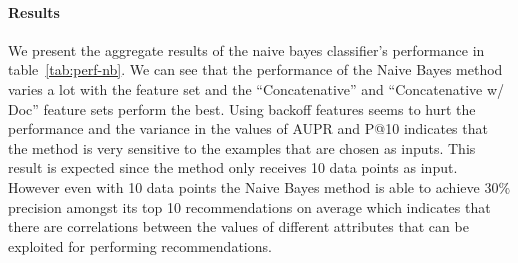 \documentclass[paper=a4,fontsize=11pt]{scrartcl}
\newcommand{\tabref}[1]{table~\ref{#1}}
\numberwithin{equation}{section}    %
\numberwithin{figure}{section}      %
\numberwithin{table}{section}       %
\begin{document}
\paragraph{Results} We present the aggregate results of the naive bayes classifier's performance in \tabref{tab:perf-nb}.
We can see that the performance of the Naive Bayes method varies a lot with the feature set
and the ``Concatenative'' and ``Concatenative w/ Doc'' feature sets perform the best.
Using backoff features seems to hurt the performance and
the variance in the values of AUPR and P@10 indicates that the method is very sensitive to
the examples that are chosen as inputs. This result is expected since the method only receives 10 data points as input.
However even with 10 data points the Naive Bayes method is able to achieve $30\%$ precision amongst its top 10
recommendations on average which indicates that there are correlations between the values of different attributes
that can be exploited for performing recommendations.

\begin{table}[htbp]
  \centering
  \caption{Performance(\%) with NB with 90\% confidence intervals.}
  \label{tab:perf-nb}
\end{table}
\end{document}

